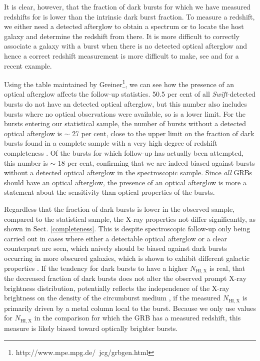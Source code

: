 \documentclass{aa}    %
\begin{document}
It is clear, however, that the fraction of dark bursts for which we have
measured redshifts for is lower than the intrinsic dark burst fraction. To
measure a redshift, we either need a detected afterglow to obtain a spectrum or
to locate the host galaxy and determine the redshift from there. It is more
difficult to correctly associate a galaxy with a burst when there is no detected
optical afterglow and hence a correct redshift measurement is more difficult to
make, see \citet{Jakobsson2005, Levesque2010} and \citet{Perley2017} for a
recent example.

Using the table maintained by
Greiner\footnote{http://www.mpe.mpg.de/~jcg/grbgen.html}, we can see how the
presence of an optical afterglow affects the follow-up statistics. 50.5 per cent
of all \textit{Swift}-detected bursts do not have an detected optical afterglow,
but this number also includes bursts where no optical observations were
available, so is a lower limit. For the bursts entering our statistical sample,
the number of bursts without a detected optical afterglow is $\sim$ 27 per cent,
close to the upper limit on the fraction of dark bursts found in a complete
sample with a very high degree of redshift completeness \citep{Melandri2012}. Of
the bursts for which follow-up has actually been attempted, this number is
$\sim$ 18 per cent, confirming that we are indeed biased against bursts without
a detected optical afterglow in the spectroscopic sample. Since \textit{all}
GRBs should have an optical afterglow, the presence of an optical afterglow is
more a statement about the sensitivity than optical properties of the bursts.

Regardless that the fraction of dark bursts is lower in the observed sample,
compared to the statistical sample, the X-ray properties not differ
significantly, as shown in Sect. \ref{completeness}. This is despite
spectroscopic follow-up only being carried out in cases where either a
detectable optical afterglow or a clear counterpart are seen, which naively
should be biased against dark bursts occurring in more obscured galaxies, which
is shown to exhibit different galactic properties \citep{Perley2009,
	Kruhler2011, Rossi2012, Perley2013b, Perley2015b}. If the tendency for dark
bursts to have a higher $N_{\mathrm{HI, X}}$ is real, that the decreased
fraction of dark bursts does not alter the observed prompt X-ray brightness
distribution, potentially reflects the independence of the X-ray brightness on
the density of the circumburst medium \citep{Freedman2001, Berger2003,
	Nysewander2009}, if the measured $N_{\mathrm{HI, X}}$ is primarily driven by a
metal column local to the burst. Because we only use values for $N_{\mathrm{HI,
		X}}$ in the comparison for which the GRB has a measured redshift, this measure
is likely biased toward optically brighter bursts.
\end{document}
